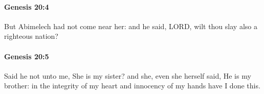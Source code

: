 		\paragraph{Genesis 20:4} %
			\label{GENESIS-20-4}

			But Abimelech had not come near her: and he said, LORD, wilt thou slay also a righteous nation?


		\paragraph{Genesis 20:5} %
			\label{GENESIS-20-5}

			Said he not unto me, She is my sister? and she, even she herself said, He is my brother: in the integrity of my heart and innocency of my hands have I done this.


